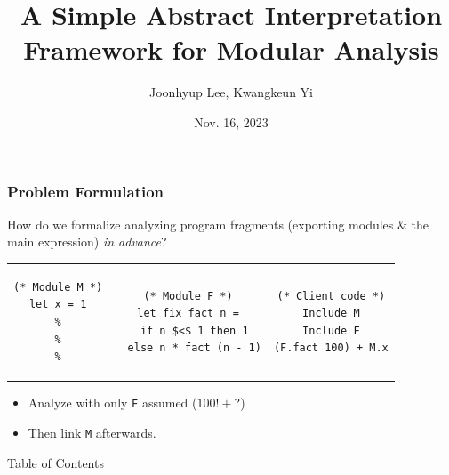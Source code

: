 \documentclass{beamer}
\title{A Simple Abstract Interpretation Framework for Modular Analysis}
\author{Joonhyup Lee, Kwangkeun Yi}
\date{Nov. 16, 2023}
\institute{ROPAS{@}SNU}
\theoremstyle{definition}
\begin{document}
\maketitle
\begin{frame}[c,fragile]
  \frametitle{Problem Formulation}
  How do we formalize analyzing program fragments (exporting modules \& the main expression) \emph{in advance}?

  \begin{tabular}{ccc}
    \begin{minipage}{0.3\linewidth}
      \begin{lstlisting}[language=Coq]
(* Module M *)
let x = 1
%
%
%
      \end{lstlisting}
    \end{minipage} &
    \begin{minipage}{0.3\linewidth}
      \begin{lstlisting}[language=Coq]
(* Module F *)
let fix fact n =
  if n $<$ 1 then 1
  else n * fact (n - 1)
      \end{lstlisting}
    \end{minipage}  &
    \begin{minipage}{0.3\linewidth}
      \begin{lstlisting}[language=Coq]
(* Client code *)
Include M
Include F
(F.fact 100) + M.x
      \end{lstlisting}
    \end{minipage}
  \end{tabular}

  \begin{itemize}
    \item Analyze with only \texttt{F} assumed ($100!+$?)
    \item Then link \texttt{M} afterwards.
  \end{itemize}

  \pause
  \begin{center}
  \end{center}
\end{frame}
\begin{frame}{Table of Contents}
  \tableofcontents
\end{frame}
\end{document}
